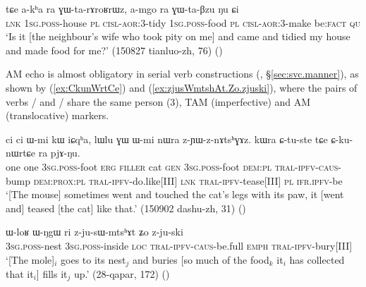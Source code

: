 \begin{exe}
\ex \label{ex:GWtaBzu}
\gll  tɕe a-kʰa ra ɣɯ-ta-rɤroʁrɯz, 	a-mgo  ra ɣɯ-ta-βzu ŋu ɕi \\
\textsc{lnk} \textsc{1sg}.\textsc{poss}-house \textsc{pl} \textsc{cisl}-\textsc{aor}:3\flobv{}-tidy 
 \textsc{1sg}.\textsc{poss}-food \textsc{pl} \textsc{cisl}-\textsc{aor}:3\flobv{}-make be:\textsc{fact} \textsc{qu} \\ 
\glt `Is it [the neighbour's wife who took pity on me] and came and tidied my house and made food for me?'  (150827 tianluo-zh, 76)
()
\end{exe}

AM echo is almost obligatory in serial verb constructions (\citealt[253--255]{jacques16complementation}, §\ref{sec:svc.manner}), as shown by (\ref{ex:CkunWrtCe}) and (\ref{ex:zjusWmtshAt.Zo.zjuski}), where the pairs of verbs  /  and   /  share the same person (3\flobv{}), TAM (imperfective) and AM (translocative) markers.

\begin{exe}
\ex \label{ex:CkunWrtCe}
\gll  ci ci ɯ-mi kɯ iɕqʰa, lɯlu ɣɯ ɯ-mi nɯra z-ɲɯ-z-nɤtsʰɣɤz. kɯra ɕ-tu-ste tɕe ɕ-ku-nɯrtɕe ra pjɤ-ŋu. \\
one one \textsc{3sg}.\textsc{poss}-foot \textsc{erg} \textsc{filler} cat \textsc{gen} \textsc{3sg}.\textsc{poss}-foot \textsc{dem}:\textsc{pl} \textsc{tral}-\textsc{ipfv}-\textsc{caus}-bump  \textsc{dem}:\textsc{prox}:\textsc{pl} \textsc{tral}-\textsc{ipfv}-do.like[III] \textsc{lnk}  \textsc{tral}-\textsc{ipfv}-tease[III] \textsc{pl} \textsc{ifr}.\textsc{ipfv}-be \\
\glt `[The mouse] sometimes went and touched the cat's legs with its paw, it [went and] teased [the cat] like that.' (150902 dashu-zh, 31)
()
\end{exe} 

\begin{exe}
\ex \label{ex:zjusWmtshAt.Zo.zjuski}
\gll    ɯ-loʁ ɯ-ŋgɯ ri z-ju-sɯ-mtsʰɤt ʑo z-ju-ski \\
\textsc{3sg}.\textsc{poss}-nest \textsc{3sg}.\textsc{poss}-inside \textsc{loc} \textsc{tral}-\textsc{ipfv}-\textsc{caus}-be.full \textsc{emph} \textsc{tral}-\textsc{ipfv}-bury[III] \\
\glt `[The mole]$_i$ goes to its nest$_j$ and buries [so much of the food$_k$ it$_i$ has collected that it$_i$] fills it$_j$ up.' (28-qapar, 172)
()
\end{exe} 

